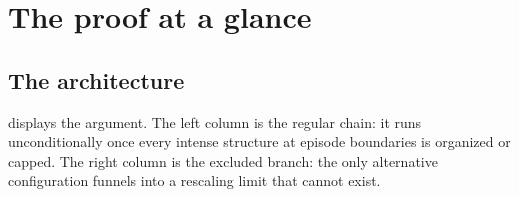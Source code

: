 \documentclass[11pt,letterpaper]{amsart}
\theoremstyle{definition}
\theoremstyle{remark}
\begin{document}
\section{The proof at a glance}\label{sec:glance}

\subsection{The architecture}\label{subsec:architecture}
 displays the argument. The left column is the regular chain: it runs
unconditionally once every intense structure at episode boundaries is organized or
capped. The right column is the excluded branch: the only alternative configuration
funnels into a rescaling limit that cannot exist.
\end{document}
